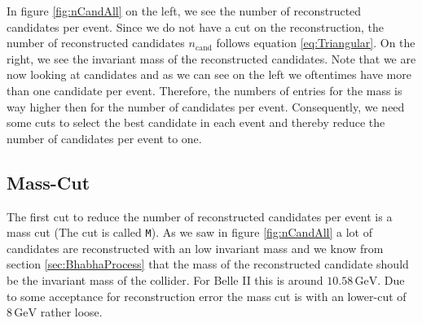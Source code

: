 \documentclass[a4paper,11pt,twosided,final,german,openbib,pdftex,listof=totoc,bibliography=totoc]{scrbook}
\begin{document}
In figure \ref{fig:nCandAll} on the left, we see the number of reconstructed candidates per event. Since we do not have a cut on the reconstruction, the number of reconstructed candidates $n_{\textrm{cand}}$ follows equation \ref{eq:Triangular}. On the right, we see the invariant mass of the reconstructed candidates. Note that we are now looking at candidates and as we can see on the left we oftentimes have more than one candidate per event. Therefore, the numbers of entries for the mass is way higher then for the number of candidates per event.
Consequently, we need some cuts to select the best candidate in each event and thereby reduce the number of candidates per event to one.


\subsection{Mass-Cut}

The first cut to reduce the number of reconstructed candidates per event is a mass cut (The cut is called \texttt{M}). As we saw in figure \ref{fig:nCandAll} a lot of candidates are reconstructed with an low invariant mass and we know from section \ref{sec:BhabhaProcess} that the mass of the reconstructed candidate should be the invariant mass of the collider. For Belle II this is around $10.58\,\textrm{GeV}$. Due to some acceptance for reconstruction error the mass cut is with an lower-cut of $8\,\textrm{GeV}$ rather loose.
\end{document}
